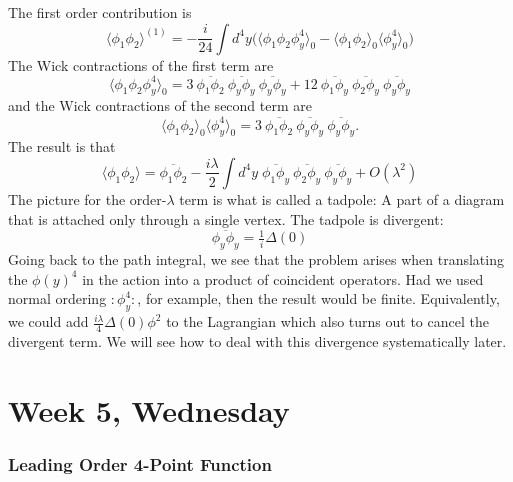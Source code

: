 \documentclass[12pt]{article}
\begin{document}
The first order contribution is
\begin{equation}
  \langle \phi_1 \phi_2 \rangle^{(1)} = 
  - \frac{i}{24} \int d^4y \Big(
  \langle \phi_1 \phi_2 \phi_y^4 \rangle_0 - 
  \langle \phi_1 \phi_2  \rangle_0 
  \langle \phi_y^4 \rangle_0 
  \Big)
\end{equation}
The Wick contractions of the first term are
\begin{equation}
  \langle \phi_1 \phi_2 \phi_y^4 \rangle_0 = 
  3~
  \overline{\phi_1 \phi_2}~
  \overline{\phi_y \phi_y}~
  \overline{\phi_y \phi_y}
  + 
  12~
  \overline{\phi_1 \phi_y}~
  \overline{\phi_2 \phi_y}~
  \overline{\phi_y \phi_y}
\end{equation}
and the Wick contractions of the second term are
\begin{equation}
  \langle \phi_1 \phi_2 \rangle_0
  \langle \phi_y^4 \rangle_0 = 
  3~
  \overline{\phi_1 \phi_2}~
  \overline{\phi_y \phi_y}~
  \overline{\phi_y \phi_y}.
\end{equation}
The result is that
\begin{equation}
  \langle \phi_1 \phi_2 \rangle  =
  \overline{\phi_1\phi_2}
  - \frac{i\lambda}{2} \int d^4y\;
  \overline{\phi_1 \phi_y}~
  \overline{\phi_2 \phi_y}~
  \overline{\phi_y \phi_y} 
  + O(\lambda^2)
\end{equation}
The picture for the order-$\lambda$ term is what is called a tadpole: A
part of a diagram that is attached only through a single vertex. The
tadpole is divergent:
\begin{equation}
  \overline{\phi_y \phi_y} 
  = \tfrac{1}{i} \Delta(0)
\end{equation}
Going back to the path integral, we see that the problem arises when
translating the $\phi(y)^4$ in the action into a product of coincident
operators. Had we used normal ordering $:\phi_y^4:$, for example, then
the result would be finite. Equivalently, we could add
$\frac{i\lambda}{4}\Delta(0)\phi^2$ to the Lagrangian which also turns
out to cancel the divergent term. We will see how to deal with this
divergence systematically later.


\section{Week 5, Wednesday}

\subsubsection{Leading Order 4-Point Function}
\end{document}
